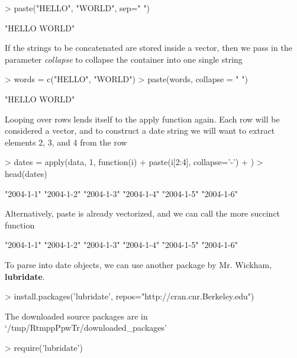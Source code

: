 \documentclass{article}
\begin{document}
\begin{Schunk}
\begin{Sinput}
> paste("HELLO", "WORLD", sep=" ")
\end{Sinput}
\begin{Soutput}
[1] "HELLO WORLD"
\end{Soutput}
\end{Schunk}

If the strings to be concatenated are stored inside a vector, then we pass
in the parameter \textit{collapse} to collapse the container into one single
string

\begin{Schunk}
\begin{Sinput}
> words = c("HELLO", "WORLD")
> paste(words, collapse = " ")
\end{Sinput}
\begin{Soutput}
[1] "HELLO WORLD"
\end{Soutput}
\end{Schunk}

Looping over rows lends itself to the apply function again.  Each row
will be considered a vector, and to construct a date string we will
want to extract elements 2, 3, and 4 from the row

\begin{Schunk}
\begin{Sinput}
> dates = apply(data, 1, function(i) {
+     paste(i[2:4], collapse='-')
+ })
> head(dates)
\end{Sinput}
\begin{Soutput}
[1] "2004-1-1" "2004-1-2" "2004-1-3" "2004-1-4" "2004-1-5" "2004-1-6"
\end{Soutput}
\end{Schunk}

Alternatively, paste is already vectorized, and we can call the more
succinct function

\begin{Schunk}
\begin{Soutput}
[1] "2004-1-1" "2004-1-2" "2004-1-3" "2004-1-4" "2004-1-5" "2004-1-6"
\end{Soutput}
\end{Schunk}

To parse into date objects, we can use another package by Mr. Wickham,
\textbf{lubridate}.

\begin{Schunk}
\begin{Sinput}
> install.packages('lubridate', repos="http://cran.cnr.Berkeley.edu")
\end{Sinput}
\begin{Soutput}
The downloaded source packages are in
	‘/tmp/RtmppPpwTr/downloaded_packages’
\end{Soutput}
\begin{Sinput}
> require('lubridate')
\end{Sinput}
\end{Schunk}
\end{document}
